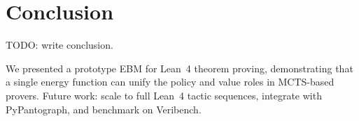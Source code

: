 
\section{Conclusion}
\label{sec:conclusion}

TODO: write conclusion.

We presented a prototype EBM for Lean~4 theorem proving, demonstrating that a single
energy function can unify the policy and value roles in MCTS-based provers.
Future work: scale to full Lean~4 tactic sequences, integrate with PyPantograph,
and benchmark on Veribench.
